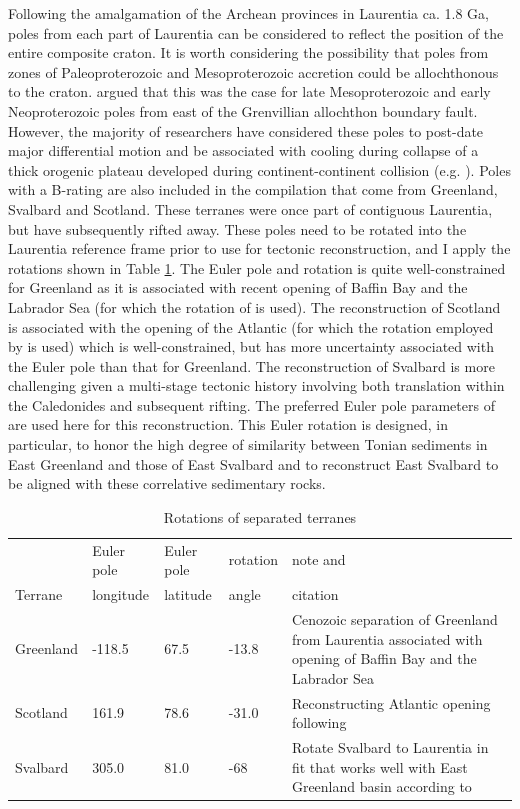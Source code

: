\documentclass[twocolumn, switch]{article} %
\begin{document}
Following the amalgamation of the Archean provinces in Laurentia ca. 1.8 Ga, poles from each part of Laurentia can be considered to reflect the position of the entire composite craton. It is worth considering the possibility that poles from zones of Paleoproterozoic and Mesoproterozoic accretion could be allochthonous to the craton. \cite{Halls2015b} argued that this was the case for late Mesoproterozoic and early Neoproterozoic poles from east of the Grenvillian allochthon boundary fault. However, the majority of researchers have considered these poles to post-date major differential motion and be associated with cooling during collapse of a thick orogenic plateau developed during continent-continent collision (e.g. \citealp{Brown2012a}). Poles with a B-rating are also included in the compilation that come from Greenland, Svalbard and Scotland. These terranes were once part of contiguous Laurentia, but have subsequently rifted away. These poles need to be rotated into the Laurentia reference frame prior to use for tectonic reconstruction, and I apply the rotations shown in Table \ref{tab:terrane_rotations}. The Euler pole and rotation is quite well-constrained for Greenland as it is associated with recent opening of Baffin Bay and the Labrador Sea (for which the rotation of \citealp{Roest1989a} is used). The reconstruction of Scotland is associated with the opening of the Atlantic (for which the rotation employed by \citealp{Torsvik2017a} is used) which is well-constrained, but has more uncertainty associated with the Euler pole than that for Greenland. The reconstruction of Svalbard is more challenging given a multi-stage tectonic history involving both translation within the Caledonides and subsequent rifting. The preferred Euler pole parameters of \cite{Maloof2006a} are used here for this reconstruction. This Euler rotation is designed, in particular, to honor the high degree of similarity between Tonian sediments in East Greenland \citep{Hoffman2012a} and those of East Svalbard \citep{Maloof2006a} and to reconstruct East Svalbard to be aligned with these correlative sedimentary rocks.

\begin{table}[hbt]
\caption{Rotations of separated terranes}
{\scriptsize
\begin{tabular}{|l|l|l|l|p{1.1 in}|}
  \hline
& Euler pole & Euler pole & rotation & note and \\
Terrane & longitude & latitude & angle & citation \\
\hline
Greenland & -118.5 & 67.5 & -13.8 & Cenozoic separation of Greenland from Laurentia associated with opening of Baffin Bay and the Labrador Sea \citep{Roest1989a} \\
\hline
Scotland & 161.9 & 78.6 & -31.0 & Reconstructing Atlantic opening following \cite{Torsvik2017a} \\
\hline
Svalbard & 305.0 & 81.0 & -68 & Rotate Svalbard to Laurentia in fit that works well with East Greenland basin according to \cite{Maloof2006a}\\
\hline
\end{tabular}
}
\label{tab:terrane_rotations}
\end{table}
\end{document}
